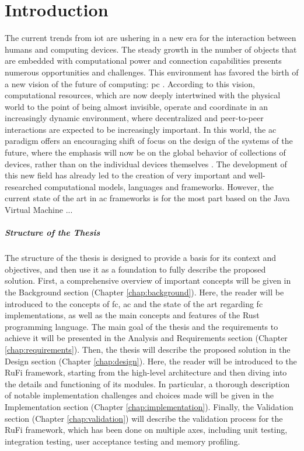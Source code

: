 
\chapter{Introduction}
\label{chap:introduction}
The current trends from \ac{iot} are ushering in a new era for the interaction between humans and computing devices. The steady growth in the number of objects that are embedded with computational power
and connection capabilities presents numerous opportunities and challenges. This environment has favored the birth of a new vision of the future of computing: \ac{pc} \cite{satyanarayanan2001pervasive}.
According to this vision, computational resources, which are now deeply intertwined with the physical world to the point of being almost invisible, operate and coordinate in an increasingly
dynamic environment, where decentralized and peer-to-peer interactions are expected to be increasingly important. In this world, the \ac{ac} paradigm offers an encouraging shift of focus on the design
of the systems of the future, where the emphasis will now be on the global behavior of collections of devices, rather than on the individual devices themselves \cite{viroli2019aggregate}.
The development of this new field has already led to the creation of very important and well-researched computational models, languages and frameworks. However, the current state of the art in \ac{ac}
frameworks is for the most part based on the Java Virtual Machine ...

\paragraph{Structure of the Thesis}
The structure of the thesis is designed to provide a basis for its context and objectives, and then use it as a foundation to fully describe the proposed solution.
First, a comprehensive overview of important concepts will be given in the Background section (Chapter \ref{chap:background}). Here, the reader will be introduced to the concepts
of \ac{fc}, \ac{ac} and the state of the art regarding \ac{fc} implementations, as well as the main concepts and features of the Rust programming language.
The main goal of the thesis and the requirements to achieve it will be presented in the Analysis and Requirements section (Chapter \ref{chap:requirements}).
Then, the thesis will describe the proposed solution in the Design section (Chapter \ref{chap:design}). Here, the reader will be introduced to the RuFi framework,
starting from the high-level architecture and then diving into the details and functioning of its modules. In particular, a thorough description of notable
implementation challenges and choices made will be given in the Implementation section (Chapter \ref{chap:implementation}). Finally, the Validation section (Chapter \ref{chap:validation})
will describe the validation process for the RuFi framework, which has been done on multiple axes, including unit testing, integration testing, user acceptance testing and memory profiling.

